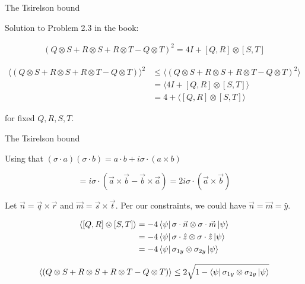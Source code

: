\documentclass[aspectratio=1610]{beamer}					%
\begin{document}
\begin{frame}{The Tsirelson bound}

Solution to Problem 2.3 in the book:

\begin{align*}
(Q\otimes S + R\otimes S  + R\otimes T  - Q\otimes T)^{2} = 4I + [Q,R]\otimes [S,T]
\end{align*}

\begin{align*}
\langle(Q\otimes S + R\otimes S  + R\otimes T  - Q\otimes T)\rangle^{2} &\leq \langle(Q\otimes S + R\otimes S  + R\otimes T  - Q\otimes T)^{2}\rangle \\
&= \langle 4I + [Q,R]\otimes [S,T]\rangle \\
&= 4 + \langle [Q,R]\otimes [S,T]\rangle
\end{align*}

for fixed $Q,R,S,T$.

\end{frame}

\begin{frame}{The Tsirelson bound}

Using that $(\sigma\cdot a)(\sigma\cdot b) = a\cdot b + i\sigma\cdot(a\times b)$

\begin{equation*}
[A,B] = i\sigma\cdot(\vec{a}\times\vec{b} - \vec{b}\times\vec{a}) = 2i\sigma\cdot(\vec{a}\times\vec{b})
\end{equation*}

Let $\vec{n} = \vec{q}\times\vec{r}$ and $\vec{m} = \vec{s}\times\vec{t}$. Per our constraints, we could have $\vec{n} = \vec{m} = \hat{y}$.

\begin{align*}
\langle [Q,R]\otimes [S,T]\rangle &= -4\bra{\psi}\sigma\cdot\vec{n}\otimes\sigma\cdot\vec{m}\ket{\psi}\\
&= -4\bra{\psi}\sigma\cdot\hat{z}\otimes\sigma\cdot\hat{z}\ket{\psi}\\
&= -4\bra{\psi}\sigma_{1y}\otimes\sigma_{2y}\ket{\psi}
\end{align*}

\begin{align*}
\langle(Q\otimes S + R\otimes S  + R\otimes T  - Q\otimes T)\rangle \leq 2\sqrt{1-\bra{\psi}\sigma_{1y}\otimes\sigma_{2y}\ket{\psi}}
\end{align*}

\end{frame}
\end{document}
